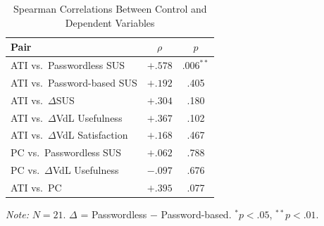 \documentclass{article}
\begin{document}
\begin{table}[htbp]
    \centering
    \begin{threeparttable}
        \caption{Spearman Correlations Between Control and Dependent Variables}
        \label{tab:correlations}
        \begin{tabular}{lcc}
            \toprule
            \textbf{Pair} & \textbf{$\rho$} & \textbf{$p$} \\
            \midrule
            ATI vs.\ Passwordless SUS        & $+.578$ & $.006^{**}$  \\
            ATI vs.\ Password-based SUS      & $+.192$ & .405    \\
            ATI vs.\ $\Delta$SUS             & $+.304$ & .180    \\
            ATI vs.\ $\Delta$VdL Usefulness  & $+.367$ & .102    \\
            ATI vs.\ $\Delta$VdL Satisfaction & $+.168$ & .467   \\
            PC vs.\ Passwordless SUS         & $+.062$ & .788    \\
            PC vs.\ $\Delta$VdL Usefulness   & $-.097$ & .676    \\
            ATI vs.\ PC                      & $+.395$ & .077    \\
            \bottomrule
        \end{tabular}
        \begin{tablenotes}
            \small
            \item \textit{Note:} $N = 21$. $\Delta$ = Passwordless $-$ Password-based. $^{*} p < .05$, $^{**} p < .01$.
        \end{tablenotes}
    \end{threeparttable}
\end{table}
\end{document}
